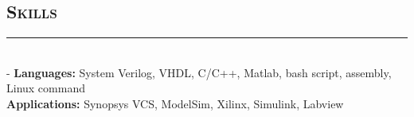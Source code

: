 \documentclass[11pt]{res}
\newcommand{\style}[1]{\color{Blue}\large\textsc{#1}}
\begin{document}
\begin{resume}
\section{\style{Skills}}
\vspace{-10pt}
\rule{18cm}{0.5mm}\\
 -\sectionwidth \resumewidth
 \textbf{Languages:}  System Verilog, VHDL, C/C++, Matlab, bash script, assembly, Linux command    \hfill \vspace{-0.5mm}\\
  \textbf{Applications:} Synopsys VCS,  ModelSim, Xilinx, Simulink, Labview\\%

   
   
   \vspace{-25pt}

\end{resume}
\end{document}

